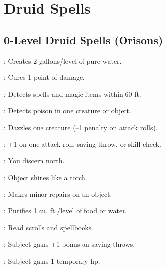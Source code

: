 \section{Druid Spells}

\begin{multicols}{2}

\subsection{0-Level Druid Spells (Orisons)}
\begin{description*}
\item[\linkspell{Create Water}:] Creates 2 gallons/level of pure water.
\item[\linkspell{Cure Minor Wounds}:] Cures 1 point of damage.
\item[\linkspell{Detect Magic}:] Detects spells and magic items within 60 ft.
\item[\linkspell{Detect Poison}:] Detects poison in one creature or object.
\item[\linkspell{Flare}:] Dazzles one creature (–1 penalty on attack rolls).
\item[\linkspell{Guidance}:] +1 on one attack roll, saving throw, or skill check.
\item[\linkspell{Know Direction}:] You discern north.
\item[\linkspell{Light}:] Object shines like a torch.
\item[\linkspell{Mending}:] Makes minor repairs on an object.
\item[\linkspell{Purify Food and Drink}:] Purifies 1 cu. ft./level of food or water.
\item[\linkspell{Read Magic}:] Read scrolls and spellbooks.
\item[\linkspell{Resistance}:] Subject gains +1 bonus on saving throws.
\item[\linkspell{Virtue}:] Subject gains 1 temporary hp.
\end{description*}


\end{multicols}
